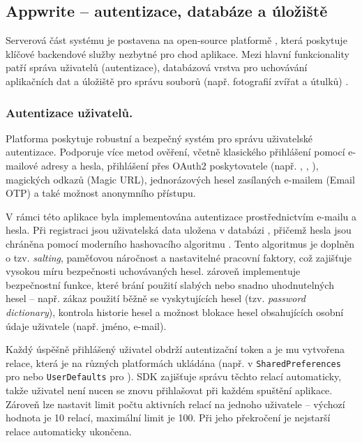 \documentclass[czech, bp, kiv, he, iso690numb, pdf]{fasthesis}
\begin{document}
    \subsection{Appwrite – autentizace, databáze a úložiště}

    Serverová část systému je postavena na open-source platformě , která poskytuje klíčové backendové služby nezbytné pro chod aplikace. Mezi hlavní funkcionality  patří správa uživatelů (autentizace), databázová vrstva pro uchovávání aplikačních dat a úložiště pro správu souborů (např. fotografií zvířat a útulků) \cite{appwrite}.

    \subsubsection*{Autentizace uživatelů.}
    Platforma  poskytuje robustní a bezpečný systém pro správu uživatelské autentizace. Podporuje více metod ověření, včetně klasického přihlášení pomocí e-mailové adresy a hesla, přihlášení přes OAuth2 poskytovatele (např. , , ), magických odkazů (Magic URL), jednorázových hesel zasílaných e-mailem (Email OTP) a také možnost anonymního přístupu.

    V rámci této aplikace byla implementována autentizace prostřednictvím e-mailu a hesla. Při registraci jsou uživatelská data uložena v databázi , přičemž hesla jsou chráněna pomocí moderního hashovacího algoritmu . Tento algoritmus je doplněn o tzv. \textit{salting}, paměťovou náročnost a nastavitelné pracovní faktory, což zajišťuje vysokou míru bezpečnosti uchovávaných hesel.  zároveň implementuje bezpečnostní funkce, které brání použití slabých nebo snadno uhodnutelných hesel – např. zákaz použití běžně se vyskytujících hesel (tzv. \textit{password dictionary}), kontrola historie hesel a možnost blokace hesel obsahujících osobní údaje uživatele (např. jméno, e-mail).

    Každý úspěšně přihlášený uživatel obdrží autentizační token a je mu vytvořena relace, která je na různých platformách ukládána (např. v \texttt{SharedPreferences} pro  nebo \texttt{UserDefaults} pro ).  SDK zajišťuje správu těchto relací automaticky, takže uživatel není nucen se znovu přihlašovat při každém spuštění aplikace. Zároveň lze nastavit limit počtu aktivních relací na jednoho uživatele – výchozí hodnota je 10 relací, maximální limit je 100. Při jeho překročení je nejstarší relace automaticky ukončena.
\end{document}

